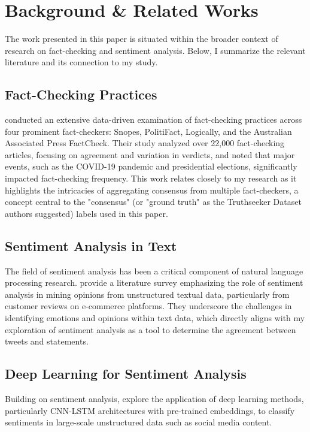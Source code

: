 \documentclass[14]{article}
\begin{document}
\section{Background \& Related Works}

The work presented in this paper is situated within the broader context of research on fact-checking and sentiment analysis. Below, I summarize the relevant literature and its connection to my study.

\subsection{Fact-Checking Practices}
\citet{fact_check_fact_checker} conducted an extensive data-driven examination of fact-checking practices across four prominent fact-checkers: Snopes, PolitiFact, Logically, and the Australian Associated Press FactCheck. Their study analyzed over 22,000 fact-checking articles, focusing on agreement and variation in verdicts, and noted that major events, such as the COVID-19 pandemic and presidential elections, significantly impacted fact-checking frequency. This work relates closely to my research as it highlights the intricacies of aggregating consensus from multiple fact-checkers, a concept central to the "consensus" (or "ground truth" as the Truthseeker Dataset authors suggested) labels used in this paper.

\subsection{Sentiment Analysis in Text}
The field of sentiment analysis has been a critical component of natural language processing research. \citet{sentiment_opinion_mining} provide a literature survey emphasizing the role of sentiment analysis in mining opinions from unstructured textual data, particularly from customer reviews on e-commerce platforms. They underscore the challenges in identifying emotions and opinions within text data, which directly aligns with my exploration of sentiment analysis as a tool to determine the agreement between tweets and statements. 

\subsection{Deep Learning for Sentiment Analysis}
Building on sentiment analysis, \citet{sentiment_deep_learning} explore the application of deep learning methods, particularly CNN-LSTM architectures with pre-trained embeddings, to classify sentiments in large-scale unstructured data such as social media content.
\end{document}
